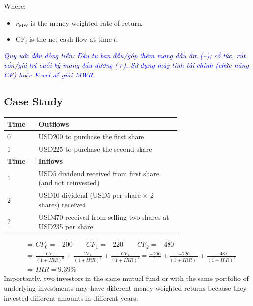 Where:
\begin{itemize}
	\item[] $r_{\text{MW}}$ is the money-weighted rate of return.
	\item[] $\text{CF}_t$ is the net cash flow at time $t$.
\end{itemize}

\textcolor{blue}{\textit{Quy ước dấu dòng tiền: Đầu tư ban đầu/góp thêm mang dấu âm (--); cổ tức, rút vốn/giá trị cuối kỳ mang dấu dương (+). Sử dụng máy tính tài chính (chức năng CF) hoặc Excel để giải MWR.}}

\subsection{Case Study}
	\label{subsec:Case Study: MWR vs TWR}
\begin{tcolorbox}[
	colback=gray!5!white,
	colframe=black!15!white,
	boxrule=0.5pt,
	arc=3pt,
	title=\textbf{Case Study: MWR vs TWR},
	coltitle=black,
	colbacktitle=black!5!white,
	before skip=6pt,
	after skip=6pt,
	breakable
]
	\begin{center}
		\begin{tabular}{p{0.1\linewidth} | p{0.6\linewidth}}
			\toprule
			\textbf{Time} & \textbf{Outflows}                                            \\
			\midrule
			0             & USD200 to purchase the first share                           \\
			1             & USD225 to purchase the second share                          \\
			\midrule
			\midrule
			\textbf{Time} & \textbf{Inflows}                                            \\
			\midrule
			1             & USD5 dividend received from first share (and not reinvested) \\
			2             & USD10 dividend (USD5 per share $\times$ 2 shares) received   \\
			2             & USD470 received from selling two shares at USD235 per share  \\
			\bottomrule
		\end{tabular}
	\end{center}
\begin{align*}
	& \Rightarrow CF_0 = -200 \qquad CF_1 = -220 \qquad CF_2 = +480 \\
	& \Rightarrow \frac{CF_0}{(1+IRR)^0} + \frac{CF_1}{(1+IRR)^1} + \frac{CF_2}{(1+IRR)^2}
	= \frac{-200}{1} + \frac{-220}{(1+IRR)^1} + \frac{+480}{(1+IRR)^2} \\
	& \Rightarrow IRR = 9.39\%
\end{align*}
Importantly, two investors in the same mutual fund or with the same portfolio of underlying investments may have diﬀerent money-weighted returns because they invested diﬀerent amounts in diﬀerent years.


\end{tcolorbox}
